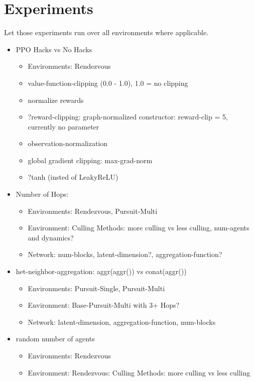 \section{Experiments}
Let those experiments run over all environments where applicable.
\begin{itemize}[noitemsep,nolistsep]
    \item PPO Hacks vs No Hacks
    \begin{itemize}[noitemsep,nolistsep]
        \item Environments: Rendezvous
        \item value-function-clipping (0.0 - 1.0), 1.0 = no clipping
        \item normalize rewards
        \item ?reward-clipping: graph-normalized constructor: reward-clip = 5, currently no parameter
        \item observation-normalization
        \item global gradient clipping: max-grad-norm
        \item ?tanh (insted of LeakyReLU)
    \end{itemize}
    \item Number of Hops:
    \begin{itemize}[noitemsep,nolistsep]
        \item Environments: Rendezvous, Pursuit-Multi
        \item Environment: Culling Methods: more culling vs less culling, num-agents and dynamics?
        \item Network: num-blocks, latent-dimension?, aggregation-function?
    \end{itemize}
    \item het-neighbor-aggregation: aggr(aggr()) vs conat(aggr())
    \begin{itemize}[noitemsep,nolistsep]
        \item Environments: Pursuit-Single, Pursuit-Multi
        \item Environment: Base-Pursuit-Multi with 3+ Hops?
        \item Network: latent-dimension, aggregation-function, num-blocks
    \end{itemize}
    \item random number of agents
    \begin{itemize}[noitemsep,nolistsep]
        \item Environments: Rendezvous
        \item Environment: Rendezvous: Culling Methods: more culling vs less culling

\end{itemize}
\end{itemize}

